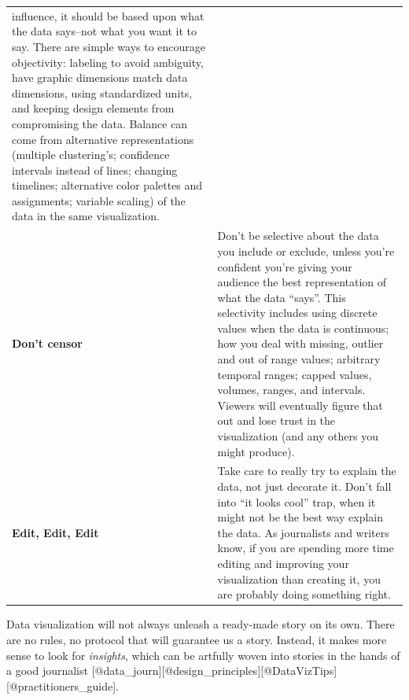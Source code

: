 \documentclass[]{book}
\theoremstyle{definition}
\theoremstyle{definition}
\theoremstyle{definition}
\theoremstyle{remark}
\begin{document}
\begin{longtable}[]{@{}ll@{}}
\begin{minipage}[t]{0.78\columnwidth}
influence, it should be based upon what the data says--not what you want
it to say. There are simple ways to encourage objectivity: labeling to
avoid ambiguity, have graphic dimensions match data dimensions, using
standardized units, and keeping design elements from compromising the
data. Balance can come from alternative representations (multiple
clustering's; confidence intervals instead of lines; changing timelines;
alternative color palettes and assignments; variable scaling) of the
data in the same visualization.\strut
\end{minipage}\tabularnewline
\begin{minipage}[t]{0.16\columnwidth}\raggedright\strut
\textbf{Don't censor}\strut
\end{minipage} & \begin{minipage}[t]{0.78\columnwidth}\raggedright\strut
Don't be selective about the data you include or exclude, unless you're
confident you're giving your audience the best representation of what
the data ``says''. This selectivity includes using discrete values when
the data is continuous; how you deal with missing, outlier and out of
range values; arbitrary temporal ranges; capped values, volumes, ranges,
and intervals. Viewers will eventually figure that out and lose trust in
the visualization (and any others you might produce).\strut
\end{minipage}\tabularnewline
\begin{minipage}[t]{0.16\columnwidth}\raggedright\strut
\textbf{Edit, Edit, Edit}\strut
\end{minipage} & \begin{minipage}[t]{0.78\columnwidth}\raggedright\strut
Take care to really try to explain the data, not just decorate it. Don't
fall into ``it looks cool'' trap, when it might not be the best way
explain the data. As journalists and writers know, if you are spending
more time editing and improving your visualization than creating it, you
are probably doing something right.\strut
\end{minipage}\tabularnewline
\bottomrule
\end{longtable}

Data visualization will not always unleash a ready-made story on its
own. There are no rules, no protocol that will guarantee us a story.
Instead, it makes more sense to look for \emph{insights}, which can be
artfully woven into stories in the hands of a good journalist
{[}@data\_journ{]}{[}@design\_principles{]}{[}@DataVizTips{]}{[}@practitioners\_guide{]}.
\end{document}
